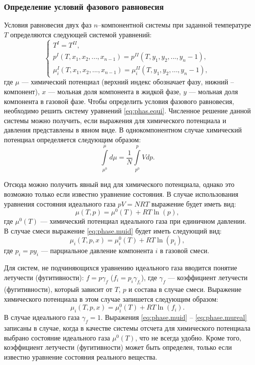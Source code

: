 \subsubsection{Определение условий фазового равновесия}
Условия равновесия двух фаз $n$--компонентной системы при заданной температуре $T$ определяются следующей системой уравнений:
\begin{equation}\label{eq:phas.equi}
\left\lbrace 
\begin{gathered} 
T^{I}=T^{II},\\
p^{I}(T,x_1,x_2,...,x_{n-1})=p^{II}(T,y_1,y_2,...,y_n-1),\\
\mu_i^{I}(T,x_1,x_2,...,x_{n-1})=\mu^{II}_i(T,y_1,y_2,...,y_n-1),
\end{gathered} 
\right.
\end{equation}
где $\mu$ --- химический потенциал (верхний индекс обозначает фазу, нижний – компонент), $x$ --- мольная доля компонента в жидкой фазе, $y$ --- мольная доля компонента в газовой фазе. Чтобы определить условия фазового равновесия, необходимо решить систему уравнений \eqref{eq:phas.equi}. Численное решение данной системы можно получить, если выражения для химического потенциала и давления представлены в явном виде.
В однокомпонентном случае химический потенциал определяется следующим образом:
\begin{equation}
\int\limits_{\mu^0}^{\mu} d \mu=\dfrac{1}{N} \int\limits_{p^0}^{p} Vdp.
\end{equation}

Отсюда можно получить явный вид для химического потенциала, однако это возможно только если известно уравнение состояния. В случае использования уравнения состояния идеального газа $pV=NRT$ выражение будет иметь вид:
\begin{equation} \label{eq:phase.muid}
	\mu(T,p)=\mu^0(T)+RT \ln (p),
\end{equation}
где $\mu^0(T)$ --- химический потенциал идеального газа при единичном давлении. В случае смеси выражение \eqref{eq:phase.muid} будет иметь следующий вид:
\begin{equation} \label{eq:phase.muidi}
	\mu_i (T,p,x) = \mu_i^0(T) + RT \ln(p_i),
\end{equation}
где $p_i=p y_i$ --- парциальное давление компонента $i$ в газовой смеси.

Для систем, не подчиняющихся уравнению идеального газа вводится понятие летучести (фугитивности): $f=p \gamma_f$ ($f_i=p_i \gamma_{f_i}$), где $\gamma_f$ --- коэффициент летучести (фугитивности), который зависит от $T$, $p$ и состава в случае смеси. Выражение химического потенциала в этом случае запишется следующим образом:
\begin{equation} \label{eq:phase.mureal}
	\mu_i (T,p,x) = \mu_i^0(T) + RT \ln(f_i).
\end{equation}
В случае идеального газа $\gamma_f=1$.
Выражения \eqref{eq:phase.muid} -- \eqref{eq:phase.mureal}  записаны в случае, когда в качестве системы отсчета для химического потенциала выбрано состояние идеального газа $\mu^0(T)$, что не всегда удобно. Кроме того, коэффициент летучести (фугитивности) может быть определен, только если известно уравнение состояния реального вещества. 

